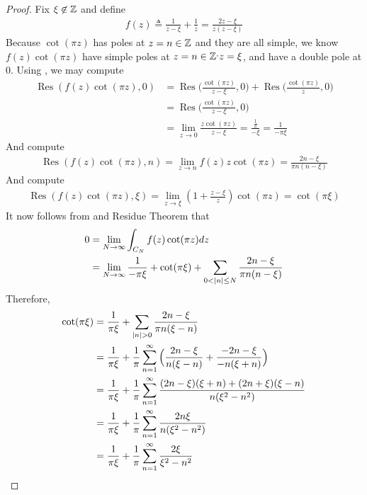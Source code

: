 \documentclass{report}
\begin{document}
\begin{proof}
Fix $\xi \not\in\mathbb{Z}$ and define 
\begin{align*}
f(z)\triangleq \frac{1}{z-\xi}+ \frac{1}{z}= \frac{2z-\xi}{z(z-\xi)}
\end{align*}
Because  $\cot (\pi  z)$ has poles at $z=n\in\mathbb{Z}$ and they are all simple, we know $f(z)\cot (\pi  z)$ have simple poles at $z=n\in\mathbb{Z}^,z=\xi$, and have a double pole at $0$. Using , we may compute 
 \begin{align*}
\operatorname{Res}(f(z)\cot (\pi  z),0)&= \operatorname{Res}\Big(\frac{\cot (\pi  z)}{z-\xi}, 0\Big)+ \operatorname{Res}\Big(\frac{\cot ( \pi z)}{z},0\Big) \\
&= \operatorname{Res}\Big(\frac{\cot (\pi  z)}{z-\xi}, 0\Big) \\
&=\lim_{z\to 0} \frac{z \cot (\pi  z)}{z-\xi}= \frac{\frac{1}{\pi }}{- \xi}= \frac{1}{- \pi \xi}
\end{align*}
And compute  
\begin{align*}
\operatorname{Res}(f(z)\cot (\pi  z), n)= \lim_{z\to n} f(z) z \cot (\pi  z)= \frac{2n - \xi}{\pi  n(n- \xi)} 
\end{align*}
And compute 
\begin{align*}
\operatorname{Res}(f(z)\cot (\pi  z), \xi)= \lim_{z\to \xi} (1+ \frac{z- \xi}{z}) \cot ( \pi  z)= \cot (\pi  \xi)
\end{align*}
It now follows from  and Residue Theorem that 
\begin{align*}
0&= \lim_{N\to \infty} \int_{C_N} f(z) \cot (\pi  z) dz \\
&=\lim_{N\to \infty} \frac{1}{-\pi  \xi}+   \cot (\pi  \xi) +\sum_{0< \left|n\right|\leq N} \frac{2n - \xi}{\pi  n (n- \xi)} 
\end{align*}
Therefore, 
\begin{align*}
  \cot (\pi  \xi)&= \frac{1}{\pi \xi}+ \sum_{\abso{n}>0} \frac{2n- \xi}{\pi n (\xi -n)}  \\
&=\frac{1}{\pi  \xi}+\frac{1}{\pi } \sum_{n=1}^{\infty} \Big( \frac{2n- \xi}{n (\xi-n)} + \frac{-2n-\xi}{-n(\xi+n)} \Big) \\
&= \frac{1}{\pi  \xi}+ \frac{1}{\pi }\sum_{n=1}^{\infty} \frac{(2n-\xi)(\xi+n)+(2n+\xi)(\xi-n)}{n(\xi^2-n^2)} \\
&=\frac{1}{\pi \xi} + \frac{1}{\pi }\sum_{n=1}^{\infty} \frac{2n\xi}{n(\xi^2-n^2)} \\
&=\frac{1}{\pi  \xi}+ \frac{1}{\pi }\sum_{n=1}^{\infty} \frac{2\xi}{\xi^2-n^2}
\end{align*}

\end{proof}
\end{document}

